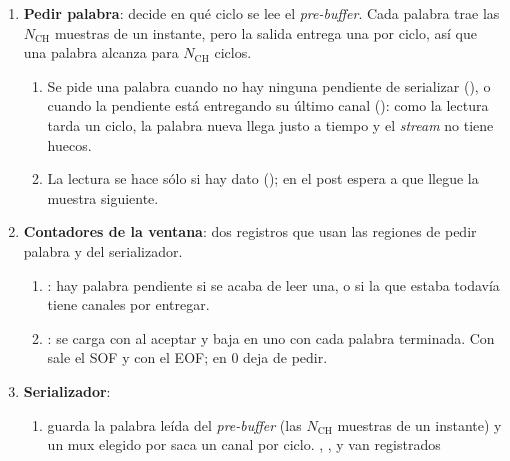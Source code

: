 \begin{enumerate}
\begin{enumerate}
      palabra de los dos canales pasa de 28 a 32 bits).
    \item Se escribe  en cada ciclo con
       y  en 1.
    \item {} suma 1 con cada .
    \item El comparador  da
      .
  \end{enumerate}
  \item \textbf{Pedir palabra}: decide en qué ciclo se lee el \emph{pre-buffer}. Cada
    palabra trae las $N_\text{CH}$ muestras de un instante, pero la salida
    entrega una por ciclo, así que una palabra alcanza para $N_\text{CH}$
    ciclos.
  \begin{enumerate}
    \item Se pide una palabra cuando no hay ninguna pendiente de serializar
      (), o cuando la pendiente está entregando su
      último canal (): como la lectura tarda un ciclo, la
      palabra nueva llega justo a tiempo y el \emph{stream} no tiene huecos.
    \item La lectura se hace sólo si hay dato
      (); en el post espera a
      que llegue la muestra siguiente.
  \end{enumerate}
  \item \textbf{Contadores de la ventana}: dos registros que usan las regiones
    de pedir palabra y del serializador.
  \begin{enumerate}
    \item {}: hay palabra pendiente si se acaba de leer una, o si
      la que estaba todavía tiene canales por entregar.
    \item {}: se carga con  al aceptar y
      baja en uno con cada palabra terminada. Con
       sale el SOF y con
       el EOF; en 0 deja de pedir.
  \end{enumerate}
  \item \textbf{Serializador}:
  \begin{enumerate}
    \item {} guarda la palabra leída del \emph{pre-buffer} (las
      $N_\text{CH}$ muestras de un instante) y un mux elegido por
       saca un canal por ciclo. ,
      ,  y  van registrados

\end{enumerate}
\end{enumerate}
